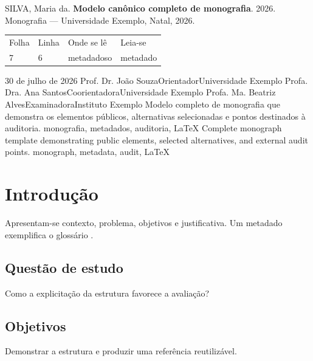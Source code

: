 \documentclass[12pt]{report}
\begin{document}
\ABNTEXacademicoexterna
{}

\ABNTEXacademicopretextual
\ABNTEXfolhaderosto
{}
\ABNTEXerrata
  {SILVA, Maria da. \textbf{Modelo canônico completo de monografia}.
   2026. Monografia — Universidade Exemplo, Natal, 2026.}
  {\begin{center}
     \begin{tabular}{llll}
       Folha & Linha & Onde se lê & Leia-se\\
       7 & 6 & metadadoso & metadado
     \end{tabular}
   \end{center}}
\ABNTEXfolhadeaprovacao
  {30 de julho de 2026}
  {%
    \ABNTEXmembrobanca
      {Prof. Dr. João Souza}{Orientador}{Universidade Exemplo}
    \ABNTEXmembrobanca
      {Profa. Dra. Ana Santos}{Coorientadora}{Universidade Exemplo}
    \ABNTEXmembrobanca
      {Profa. Ma. Beatriz Alves}{Examinadora}{Instituto Exemplo}
  }
\ABNTEXresumo
  {Modelo completo de monografia que demonstra os elementos públicos,
   alternativas selecionadas e pontos destinados à auditoria.}
  {monografia, metadados, auditoria, LaTeX}
\ABNTEXresumoemlinguaestrangeira
  {Complete monograph template demonstrating public elements, selected
   alternatives, and external audit points.}
  {monograph, metadata, audit, LaTeX}
\ABNTEXlistadeilustracoes
\ABNTEXlistadetabelas
\ABNTEXlistadeabreviaturasesiglas
\ABNTEXlistadesimbolos
\ABNTEXsumario

\ABNTEXacademicotextual
\chapter{Introdução}
Apresentam-se contexto, problema, objetivos e justificativa. Um
\gls{metadado} exemplifica o glossário \parencite{associacao2025}.
\section{Questão de estudo}
Como a explicitação da estrutura favorece a avaliação?
\section{Objetivos}
Demonstrar a estrutura e produzir uma referência reutilizável.
\end{document}
